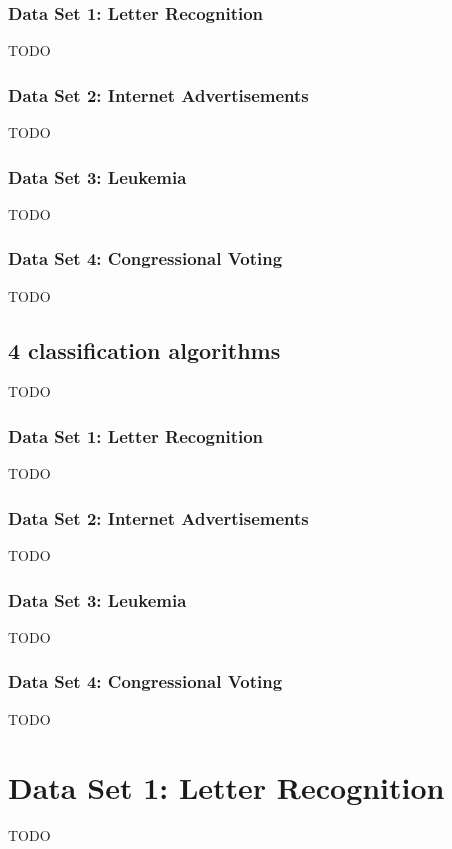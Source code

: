 \documentclass{sig-alternate-05-2015}
\begin{document}
\subsubsection{Data Set 1: Letter Recognition}
TODO\\
\subsubsection{Data Set 2: Internet Advertisements}
TODO\\
\subsubsection{Data Set 3: Leukemia}
TODO\\
\subsubsection{Data Set 4: Congressional Voting}
TODO\\


\subsection{4 classification algorithms}
TODO\\

\subsubsection{Data Set 1: Letter Recognition}
TODO\\
\subsubsection{Data Set 2: Internet Advertisements}
TODO\\
\subsubsection{Data Set 3: Leukemia}
TODO\\
\subsubsection{Data Set 4: Congressional Voting}
TODO\\


\section{Data Set 1: Letter Recognition}
TODO\\
\end{document}

